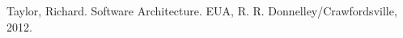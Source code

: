 \begin{thebibliography}{9}


	
	 Taylor, Richard. Software Architecture. EUA, R. R. Donnelley/Crawfordsville, 2012.
\end{thebibliography}